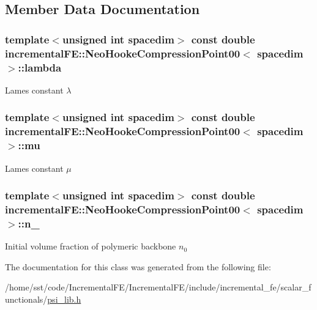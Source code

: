 \subsection{Member Data Documentation}
\subsubsection[{\texorpdfstring{lambda}{lambda}}]{\setlength{\rightskip}{0pt plus 5cm}template$<$unsigned int spacedim$>$ const double {\bf incremental\+F\+E\+::\+Neo\+Hooke\+Compression\+Point00}$<$ spacedim $>$\+::lambda\hspace{0.3cm}{\ttfamily [private]}}\hypertarget{classincremental_f_e_1_1_neo_hooke_compression_point00_a1b1c0c8dcca2410288a9ef014a117870}{}\label{classincremental_f_e_1_1_neo_hooke_compression_point00_a1b1c0c8dcca2410288a9ef014a117870}
Lame\textquotesingle{}s constant $\lambda$ 
\subsubsection[{\texorpdfstring{mu}{mu}}]{\setlength{\rightskip}{0pt plus 5cm}template$<$unsigned int spacedim$>$ const double {\bf incremental\+F\+E\+::\+Neo\+Hooke\+Compression\+Point00}$<$ spacedim $>$\+::mu\hspace{0.3cm}{\ttfamily [private]}}\hypertarget{classincremental_f_e_1_1_neo_hooke_compression_point00_a647e6e22708201ca6093e1daeaf7326c}{}\label{classincremental_f_e_1_1_neo_hooke_compression_point00_a647e6e22708201ca6093e1daeaf7326c}
Lame\textquotesingle{}s constant $\mu$ 
\subsubsection[{\texorpdfstring{n\+\_\+0}{n_0}}]{\setlength{\rightskip}{0pt plus 5cm}template$<$unsigned int spacedim$>$ const double {\bf incremental\+F\+E\+::\+Neo\+Hooke\+Compression\+Point00}$<$ spacedim $>$\+::n\+\_\hspace{0.3cm}{\ttfamily [private]}}\hypertarget{classincremental_f_e_1_1_neo_hooke_compression_point00_aba531cf944d6455c9aebc49bdcb45019}{}\label{classincremental_f_e_1_1_neo_hooke_compression_point00_aba531cf944d6455c9aebc49bdcb45019}
Initial volume fraction of polymeric backbone $n_0$ 

The documentation for this class was generated from the following file\+:\begin{DoxyCompactItemize}
\item 
/home/sst/code/\+Incremental\+F\+E/\+Incremental\+F\+E/include/incremental\+\_\+fe/scalar\+\_\+functionals/\hyperlink{psi__lib_8h}{psi\+\_\+lib.\+h}\end{DoxyCompactItemize}
